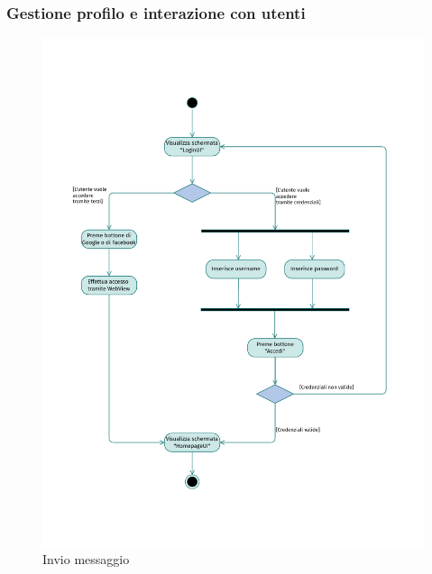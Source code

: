\documentclass{natourDoc}
\begin{document}
	\subsubsection{Gestione profilo e interazione con utenti}
	\begin{figure}[!htbp]
		\centering
		\includegraphics[width=\textwidth, page=16]{./diagrams/activity.pdf}
		\caption{Invio messaggio}
	\end{figure}
	\FloatBarrier
	
\end{document}
